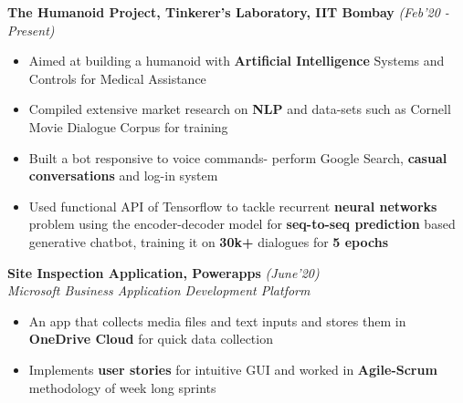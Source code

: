 \documentclass[10.5pt]{article}
\begin{document}

  \vspace{0pt}
  \textbf{The Humanoid Project, Tinkerer's Laboratory, IIT Bombay} \hfill{\sl\small(Feb'20 - Present)}\\
  
  \begin{itemize}[itemsep=-1.5mm, leftmargin=*]
  \vspace{-18pt}
      \item Aimed at building a humanoid with \textbf{Artificial Intelligence} Systems and Controls for Medical Assistance 
     
      \item Compiled extensive market research on \textbf{NLP} and data-sets such as Cornell Movie Dialogue Corpus for training   
     
      \item Built a bot responsive to voice commands- perform Google Search, \textbf{casual conversations} and log-in system
     
      \item Used functional API of Tensorflow to tackle recurrent \textbf{neural networks} problem using the encoder-decoder model for \textbf{seq-to-seq prediction} based generative chatbot, training it on \textbf{30k+} dialogues for \textbf{5 epochs} 
      
     
     
  \end{itemize}
  
  \vspace{-5 pt}
  \hspace{-18 pt}
  \textbf{Site Inspection Application, Powerapps} \hfill{\sl\small (June'20)}\\
\textit{Microsoft Business Application Development Platform}\\
  \vspace{-17pt}
  \begin{itemize}[itemsep = -1.5 mm, leftmargin=*]
    \item An app that collects media files and text inputs and stores them in \textbf{OneDrive Cloud} for quick data collection
    
    \item Implements \textbf{user stories} for intuitive GUI and worked in \textbf{Agile-Scrum} methodology of week long sprints 
  \end{itemize}
  
\end{document}
